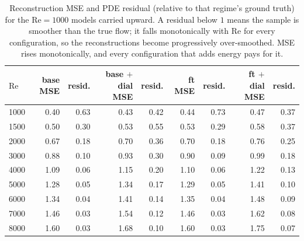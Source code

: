 \begin{table}[t]
  \centering
  \caption{Reconstruction MSE and PDE residual (relative to that regime's ground truth) for the $\mathrm{Re}=1000$ models carried upward. A residual below $1$ means the sample is smoother than the true flow; it falls monotonically with $\mathrm{Re}$ for every configuration, so the reconstructions become progressively over-smoothed. MSE rises monotonically, and every configuration that adds energy pays for it.}
  \label{tab:mse-resid-upward}
  \begin{tabular}{lrrrrrrrr}
    \toprule
    $\mathrm{Re}$ & base MSE & resid. & base $+$ dial MSE & resid. & ft MSE & resid. & ft $+$ dial MSE & resid. \\
    \midrule
    1000 & 0.40 & 0.63 & 0.43 & 0.42 & 0.44 & 0.73 & 0.47 & 0.37 \\
    1500 & 0.50 & 0.30 & 0.53 & 0.55 & 0.53 & 0.29 & 0.58 & 0.37 \\
    2000 & 0.67 & 0.18 & 0.70 & 0.36 & 0.70 & 0.18 & 0.76 & 0.25 \\
    3000 & 0.88 & 0.10 & 0.93 & 0.30 & 0.90 & 0.09 & 0.99 & 0.18 \\
    4000 & 1.09 & 0.06 & 1.15 & 0.20 & 1.10 & 0.06 & 1.22 & 0.13 \\
    5000 & 1.28 & 0.05 & 1.34 & 0.17 & 1.29 & 0.05 & 1.41 & 0.10 \\
    6000 & 1.34 & 0.04 & 1.41 & 0.14 & 1.35 & 0.04 & 1.48 & 0.09 \\
    7000 & 1.46 & 0.03 & 1.54 & 0.12 & 1.46 & 0.03 & 1.62 & 0.08 \\
    8000 & 1.60 & 0.03 & 1.68 & 0.10 & 1.60 & 0.03 & 1.75 & 0.07 \\
    \bottomrule
  \end{tabular}
\end{table}
